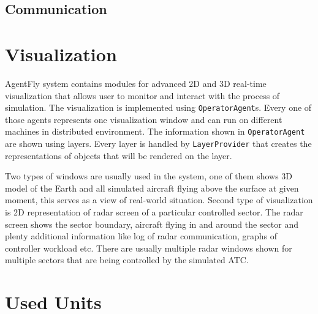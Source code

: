\subsection{Communication}





\section{Visualization}
AgentFly system contains modules for advanced 2D and 3D real-time visualization that allows user to monitor and interact with the process of simulation. The visualization is 
implemented using \texttt{OperatorAgent}s. Every one of those agents represents one visualization window and can run on different machines in distributed environment. The information shown in \texttt{OperatorAgent} are shown using layers. Every layer is handled by \texttt{LayerProvider} that creates the representations of objects that will be rendered on the layer.

Two types of windows are usually used in the system, one of them shows 3D model of the Earth and all simulated aircraft flying above the surface at given moment, this serves as a view of real-world situation. Second type of visualization is 2D representation of radar screen of a particular controlled sector. The radar screen shows the sector boundary, aircraft flying in and around the sector and plenty additional information like log of radar communication, graphs of controller workload etc. There are usually multiple radar windows shown for multiple sectors that are being controlled by the simulated ATC.

\section{Used Units}


